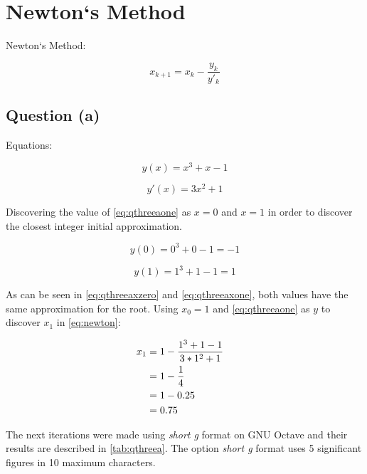 \section{Newton`s Method}

	Newton`s Method:

	\begin{equation}
		x_{k+1} = x_{k} - \frac{y_{k}}{y'_{k}}
	\label{eq:newton}
	\end{equation}

	\subsection{Question (a)}
		
		Equations:

		\begin{equation}
			y(x) = x^3 + x - 1
		\label{eq:qthreeaone}
		\end{equation}

		\begin{equation}
			y'(x) = 3x^2 + 1
		\label{eq:qthreeaoned}
		\end{equation}

		Discovering the value of \cref{eq:qthreeaone} as $x = 0$ and $x = 1$ in order to discover the closest integer initial approximation.

		\begin{equation}
			y(0) = 0^3 + 0 - 1 = -1
		\label{eq:qthreeaxzero}
		\end{equation}

		\begin{equation}
			y(1) = 1^3 + 1 - 1 = 1
		\label{eq:qthreeaxone}
		\end{equation}

		As can be seen in \cref{eq:qthreeaxzero} and \cref{eq:qthreeaxone}, both values have the same approximation for the root. Using $x_{0} = 1$ and \cref{eq:qthreeaone} as $y$ to discover $x_{1}$ in \cref{eq:newton}:
	
		\begin{align}
			x_{1} &= 1 - \frac{1^3 + 1 - 1}{3*1^2 + 1}& \notag \\
			&= 1 - \frac{1}{4}& \notag \\
			&= 1 - 0.25& \notag \\
			&= 0.75&
			\label{eq:qthreeaxones}
		\end{align}

		The next iterations were made using \emph{short g} format on GNU Octave and their results are described in \cref{tab:qthreea}. The option \emph{short g} format uses 5 significant figures in 10 maximum characters.

